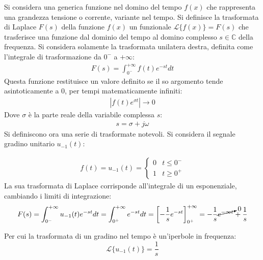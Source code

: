 \documentclass{article}
\numberwithin{equation}{subsection}
\begin{document}
Si considera una generica funzione nel domino del tempo $f(x)$ che rappresenta una grandezza tensione o corrente, variante nel tempo. 
Si definisce la trasformata di Laplace $F(s)$ della funzione $f(x)$ un funzionale $\mathcal{L}\{f(x)\}=F(s)$ che trasferisce una funzione dal dominio del tempo al domino 
complesso $s\in\mathbb{C}$ della frequenza. Si considera solamente la trasformata unilatera destra, definita come l'integrale di trasformazione da $0^-$ a $+\infty$:
\begin{gather}
    F(s)=\displaystyle\int_{0^-}^{+\infty}f(t)e^{-st}dt
\end{gather}
Questa funzione restituisce un valore definito se il so argomento tende asintoticamente a $0$, per tempi matematicamente infiniti:
\begin{gather*}
    |f(t)e^{\sigma t}|\to0
\end{gather*}
Dove $\sigma$ è la parte reale della variabile complessa $s$:
\begin{gather*}
    s=\sigma+j\omega
\end{gather*}
Si definiscono ora una serie di trasformate notevoli. Si considera il segnale gradino unitario $u_{-1}(t)$:
\begin{center}
\end{center}
\begin{gather*}
    f(t)=u_{-1}(t)=\begin{cases}
        0&t\leq 0^-\\
        1&t\geq 0^+
    \end{cases}
\end{gather*}
La sua trasformata di Laplace corrisponde all'integrale di un esponenziale, cambiando i limiti di integrazione:
\begin{gather*}
    F(s)=\displaystyle\int_{0^-}^{+\infty}u_{-1}(t)e^{-st}dt=\int_{0^+}^{+\infty}e^{-st}dt=\left[-\frac{1}{s}e^{-st}\right]_{0^+}^{+\infty}=-\frac{1}{s}\cancelto{0}{e^{-\infty t}}+\frac{1}{s}
\end{gather*}

Per cui la trasformata di un gradino nel tempo è un'iperbole in frequenza:
\begin{equation}
    \mathcal{L}\{u_{-1}(t)\}=\displaystyle\frac{1}{s}
\end{equation}
\end{document}

